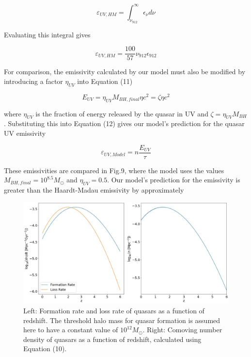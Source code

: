 \documentclass[12pt, twocolumn]{report}%
\begin{document}
\begin{equation}
    \varepsilon_{UV,HM}=\int_{\nu_{912}}^{\infty}\epsilon_\nu d\nu
\end{equation}

\noindent Evaluating this integral gives

\begin{equation}
    \varepsilon_{UV,HM}=\frac{100}{57}\nu_{912}\epsilon_{912}
\end{equation}

For comparison, the emissivity calculated by our model must also be modified by introducing a factor $\eta_{UV}$ into Equation (11)

\begin{equation}
    E_{UV}=\eta_{UV}M_{BH,final}\eta c^2=\zeta\eta c^2
\end{equation}

\noindent where $\eta_{UV}$ is the fraction of energy released by the quasar in UV and $\zeta=\eta_{UV}M_{BH}$. Substituting this into Equation (12) gives our model's prediction for the quasar UV emissivity

\begin{equation}
    \varepsilon_{UV,Model}=n\frac{E_{UV}}{\tau}
\end{equation}

These emissivities are compared in Fig.9, where the model uses the values $M_{BH,final}=10^{8.5}M_\odot$ and $\eta_{UV}=0.5$. Our model's prediction for the emissivity is greater than the Haardt-Madau emissivity by approximately

\clearpage

\onecolumngrid


\begin{figure}[H]
\centering
\includegraphics[width=\linewidth]{Plot_7a.jpeg}
\caption{Left: Formation rate and loss rate of quasars as a function of redshift. The threshold halo mass for quasar formation is assumed here to have a constant value of $10^{12}M_\odot$. Right: Comoving number density of quasars as a function of redshift, calculated using Equation (10).}
\label{fig:7}
\end{figure}
\end{document}
